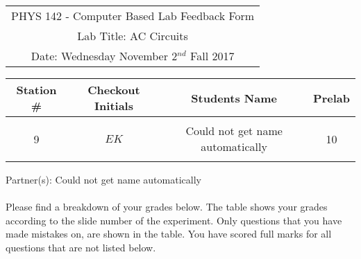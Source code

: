 \documentclass{article}
\begin{document}

\begin{table}[h]
	\centering
	\begin{tabular}{c}
	PHYS 142 - Computer Based Lab Feedback Form\\
	Lab Title: AC Circuits\\Date: Wednesday November 2$^{nd}$ Fall 2017 \\\hline
\end{tabular}
\end{table}
\begin{table}[h]\centering \begin{tabular}{|c|c|p{9.9 cm}|c|}\hline Station \#  & Checkout Initials & \multicolumn{1}{|c|}{Students Name} & Prelab \\\hline\multirow{3}{*}{9}& \multirow{3}{*}{$EK$} & &\\& &\multicolumn{1}{|c|}{Could not get name automatically}&10\\&   &  &\\\hline
\end{tabular}
\end{table}
Partner(s): Could not get name automatically\\
\\Please find a breakdown of your grades below. The table shows your grades according to the slide number of the experiment. Only questions that you have made mistakes on, are shown in the table. You have scored full marks for all questions that are not listed below.
\end{document}
